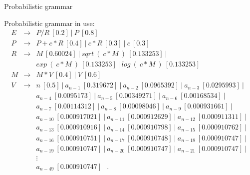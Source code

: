 \documentclass[t,usenames,dvipsnames]{beamer} %
\newcommand{\1}{\boldsymbol{1}}
\newcommand{\0}{\boldsymbol{0}}
\begin{document}
 \begin{frame}{Probabilistic grammar}

Probabilistic grammar in use:
 \scriptsize
 \begin{eqnarray*}
 E & \to & P / R\ [0.2]\ |\ P\ [0.8] \\
 P & \to & P + c * R\ [0.4]\ |\  c * R\ [0.3]\ |\ c\ [0.3] \\
 R & \to & M\ [0.60024]\ |\ sqrt\ (\ c * M\ )\ [0.133253]\ |\  \\
 & & exp\ (\ c * M \ )\ [0.133253]\ |\ 
 log\ (\ c * M \ )\ [0.133253]  \\
 M & \to & M * V\ [0.4]\ |\ V\ [0.6] \\
 V & \to & n\ [0.5]\  | \ 
 a_{n-1}\ [0.319672]  \ | \ 
 a_{n-2}\ [0.0965392]  \ | \ 
 a_{n-3}\ [0.0295993]  \ | \ \\ &&
 a_{n-4}\ [0.0095173]  \ | \  
 a_{n-5}\ [0.00349271]  \ | \ 
 a_{n-6}\ [0.00168534]  \ | \ \\ &&
 a_{n-7}\ [0.00114312]  \ | \ 
 a_{n-8}\ [0.00098046]  \ | \ 
 a_{n-9}\ [0.000931661]  \ | \ \\ &&
 a_{n-10}\ [0.000917021]\ | \ 
 a_{n-11}\ [0.000912629]\ | \ 
 a_{n-12}\ [0.000911311]\ | \ \\ &&
 a_{n-13}\ [0.000910916]\ | \ 
 a_{n-14}\ [0.000910798]\ | \ 
 a_{n-15}\ [0.000910762]\ | \ \\ &&
 a_{n-16}\ [0.000910751]\ | \ 
 a_{n-17}\ [0.000910748]\ | \ 
 a_{n-18}\ [0.000910747]\ | \  \\ &&
 a_{n-19}\ [0.000910747]\ | \ 
 a_{n-20}\ [0.000910747]\ | \   
 a_{n-21}\ [0.000910747]\ | \   \\
 & & \vdots  \\
 & &  a_{n-49}\ [0.000910747]\ 
 \enspace.
 \end{eqnarray*}

 \end{frame}
\end{document}
